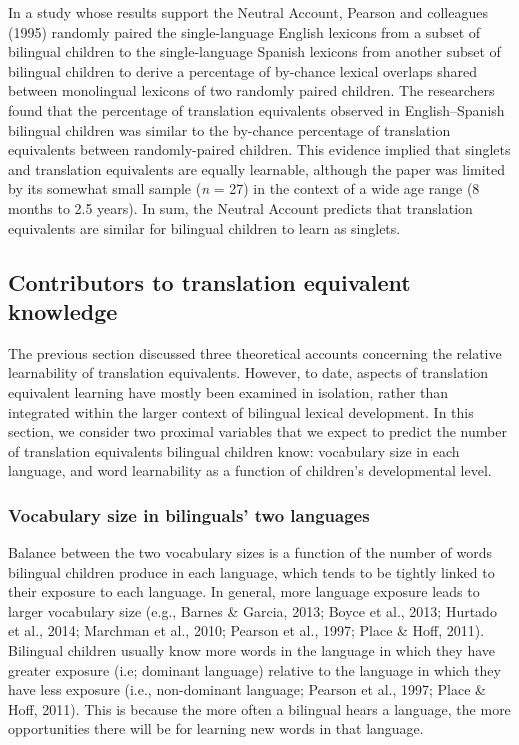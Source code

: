 \documentclass[
  english,
  ,man,floatsintext]{apa6}
\begin{document}
In a study whose results support the Neutral Account, Pearson and colleagues (1995) randomly paired the single-language English lexicons from a subset of bilingual children to the single-language Spanish lexicons from another subset of bilingual children to derive a percentage of by-chance lexical overlaps shared between monolingual lexicons of two randomly paired children. The researchers found that the percentage of translation equivalents observed in English--Spanish bilingual children was similar to the by-chance percentage of translation equivalents between randomly-paired children. This evidence implied that singlets and translation equivalents are equally learnable, although the paper was limited by its somewhat small sample (\emph{n} = 27) in the context of a wide age range (8 months to 2.5 years). In sum, the Neutral Account predicts that translation equivalents are similar for bilingual children to learn as singlets.

\hypertarget{contributors-to-translation-equivalent-knowledge}{%
\subsection{Contributors to translation equivalent knowledge}\label{contributors-to-translation-equivalent-knowledge}}

The previous section discussed three theoretical accounts concerning the relative learnability of translation equivalents. However, to date, aspects of translation equivalent learning have mostly been examined in isolation, rather than integrated within the larger context of bilingual lexical development. In this section, we consider two proximal variables that we expect to predict the number of translation equivalents bilingual children know: vocabulary size in each language, and word learnability as a function of children's developmental level.

\hypertarget{vocabulary-size-in-bilinguals-two-languages}{%
\subsubsection{Vocabulary size in bilinguals' two languages}\label{vocabulary-size-in-bilinguals-two-languages}}

Balance between the two vocabulary sizes is a function of the number of words bilingual children produce in each language, which tends to be tightly linked to their exposure to each language. In general, more language exposure leads to larger vocabulary size (e.g., Barnes \& Garcia, 2013; Boyce et al., 2013; Hurtado et al., 2014; Marchman et al., 2010; Pearson et al., 1997; Place \& Hoff, 2011). Bilingual children usually know more words in the language in which they have greater exposure (i.e; dominant language) relative to the language in which they have less exposure (i.e., non-dominant language; Pearson et al., 1997; Place \& Hoff, 2011). This is because the more often a bilingual hears a language, the more opportunities there will be for learning new words in that language.
\end{document}
